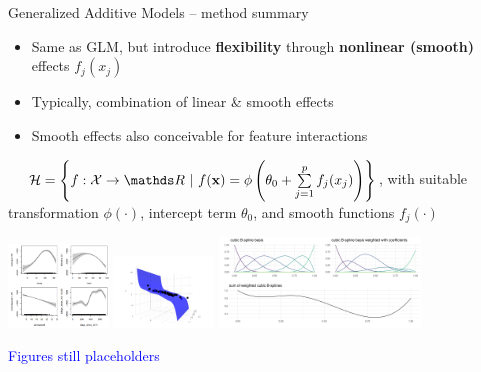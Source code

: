 \begin{vbframe}{Generalized Additive Models -- method summary}

  
 
\medskip

\begin{itemize}
  \item Same as GLM, but introduce \textbf{flexibility} through
  \textbf{nonlinear (smooth)} effects $f_j(x_j)$
  \item Typically, combination of linear \& smooth effects
  \item Smooth effects also conceivable for feature interactions
\end{itemize}
\medskip

 ~~
$\Hspace = \left\{f: \Xspace \to \R ~|~\fx = \phi \left(\theta_0 + \sumjp
f_j(x_j) \right) \right\}$,
with suitable transformation $\phi(\cdot)$, intercept term $\theta_0$, and smooth
functions $f_j(\cdot)$

\vfill

\includegraphics[width=0.2\textwidth]{figure/smooth_effects}
\includegraphics[width=0.2\textwidth]{figure/reg_poly_biv}
\includegraphics[width=0.4\textwidth]{figure/bspline-basis}

\textcolor{blue}{Figures still placeholders}

\framebreak



\end{vbframe}
